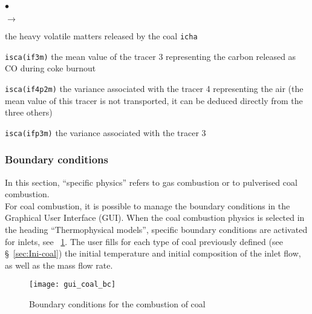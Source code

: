 {{{\begin{list}{$\bullet$}{}
\begin{list}{$\rightarrow$}{}
\begin{list}{}{}
                                        the heavy volatile matters released by
                                        the coal \texttt{icha}
                                  \item \texttt{isca(if3m)}
                                        the mean value of the tracer 3
                                        representing the carbon released
                                        as CO during coke burnout
                                  \item \texttt{isca(if4p2m)} the
                                  variance associated with the tracer 4
                                  representing the air (the mean value of this
                                  tracer is not transported, it can be deduced
                                  directly from the three others)
                                  \item \texttt{isca(ifp3m)} the
                                  variance associated with the tracer 3
                           \end{list}
              \end{list}
\end{list}

\subsubsection{Boundary conditions}\label{sec:coal-cl}
In this section, ``specific physics'' refers to gas combustion or
to pulverised coal combustion.\\
For coal combustion, it is possible to manage the boundary conditions in the Graphical User Interface (GUI). When the coal combustion physics is selected in the heading ``Thermophysical models'', specific boundary conditions are activated for inlets, see \figurename~\ref{fig:cond_lim-coal}. The user fills for each type of coal previously defined (see \S~\ref{sec:Ini-coal}) the initial temperature and initial composition of the inlet flow, as well as the mass flow rate.

\begin{figure}[!ht]
\begin{center}
\texttt{[image: gui\_coal\_bc]}
\caption{Boundary conditions for the combustion of coal}
\label{fig:cond_lim-coal}
\end{center}
\end{figure}

}}}
